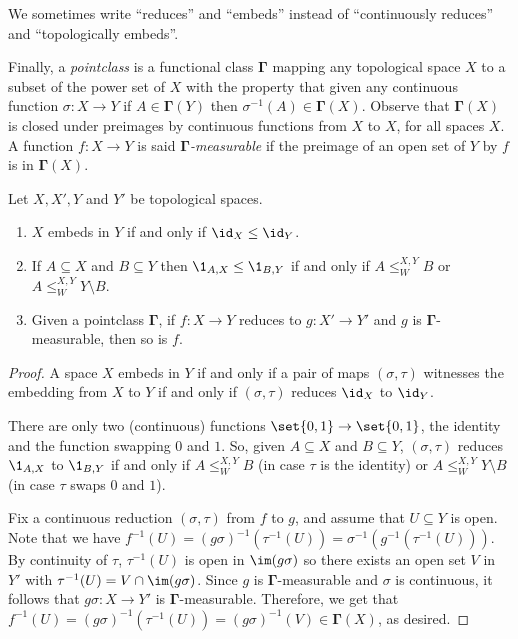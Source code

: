 We sometimes write \enquote{reduces} and \enquote{embeds} instead of \enquote{continuously reduces} and \enquote{topologically embeds}.

Finally, a \emph{pointclass} is a functional class $\mathbf{\Gamma}$%
 mapping any topological space $X$ to a subset of the power set of $X$ with the property
that given any continuous function $\sigma:X\to Y$ if $A\in\mathbf{\Gamma}(Y)$ then $\sigma^{-1}(A)\in\mathbf{\Gamma}(X)$.
Observe that $\mathbf{\Gamma}(X)$ is closed under preimages by continuous functions from $X$ to $X$, for all spaces $X$.
A function $f:X\to Y$ is said \emph{$\mathbf{\Gamma}$-measurable} if the preimage of an open set of $Y$ by $f$ is in $\mathbf{\Gamma}(X)$.

\begin{proposition}\label{LinkswithWadgeEmbedMeas}
Let $X,X',Y$ and $Y'$ be topological spaces.
\begin{enumerate}
\item $X$ embeds in $Y$ if and only if $\id_X\leq\id_Y$.
\item If $A\subseteq X$ and $B\subseteq Y$ then $\1_{A,X}\leq\1_{B,Y}$ if and only if $A\leq^{X,Y}_WB$ or $A\leq^{X,Y}_WY\setminus B$.
\item Given a pointclass $\mathbf{\Gamma}$, if $f:X\to Y$ reduces to $g:X'\to Y'$ and $g$ is $\mathbf{\Gamma}$-measurable, then so is $f$.
\end{enumerate}
\end{proposition}


\begin{proof}
A space $X$ embeds in $Y$ if and only if a pair of maps $(\sigma,\tau)$ witnesses the embedding from $X$ to $Y$ if and only if $(\sigma,\tau)$ reduces $\id_X$ to $\id_Y$.

There are only two (continuous) functions $\set{0,1}\to\set{0,1}$, the identity and the function swapping $0$ and $1$.
So, given $A\subseteq X$ and $B\subseteq Y$, $(\sigma,\tau)$ reduces $\1_{A,X}$ to $\1_{B,Y}$ if and only if $A\leq^{X,Y}_WB$ (in case $\tau$ is the identity)
or $A\leq^{X,Y}_WY\setminus B$ (in case $\tau$ swaps $0$ and $1$).

Fix a continuous reduction $(\sigma,\tau)$ from $f$ to $g$, and assume that $U\subseteq Y$ is open. Note that we have $f^{-1}(U)=(g\sigma)^{-1}(\tau^{-1}(U))=\sigma^{-1}(g^{-1}(\tau^{-1}(U)))$. By continuity of $\tau$, $\tau^{-1}(U)$ is open in $\im (g\sigma)$ so there exists an open set $V$ in $Y'$ with $\tau^{-1}(U)=V\cap \im (g\sigma)$. Since $g$ is $\mathbf{\Gamma}$-measurable and $\sigma$ is continuous, it follows that $g\sigma:X\to Y'$ is $\mathbf{\Gamma}$-measurable. Therefore, we get that $f^{-1}(U)=(g\sigma)^{-1}(\tau^{-1}(U))=(g\sigma)^{-1}(V)\in \mathbf{\Gamma}(X)$, as desired.
\end{proof}

